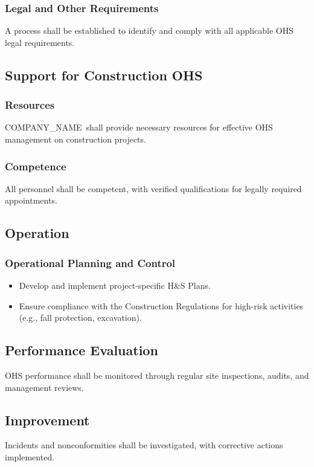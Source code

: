 \documentclass[11pt]{article}
\newcommand{\clientName}{{{COMPANY_NAME}}}
\begin{document}
\subsubsection{Legal and Other Requirements}
A process shall be established to identify and comply with all applicable OHS legal requirements.

\subsection{Support for Construction OHS}

\subsubsection{Resources}
\clientName\ shall provide necessary resources for effective OHS management on construction projects.

\subsubsection{Competence}
All personnel shall be competent, with verified qualifications for legally required appointments.

\subsection{Operation}

\subsubsection{Operational Planning and Control}
\begin{itemize}
    \item Develop and implement project-specific H\&S Plans.
    \item Ensure compliance with the Construction Regulations for high-risk activities (e.g., fall protection, excavation).
\end{itemize}

\subsection{Performance Evaluation}
OHS performance shall be monitored through regular site inspections, audits, and management reviews.

\subsection{Improvement}
Incidents and nonconformities shall be investigated, with corrective actions implemented.
\end{document}
